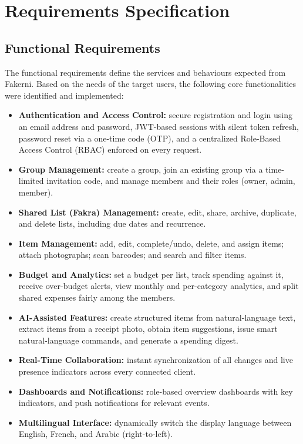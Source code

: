 \documentclass[12pt,a4paper,oneside]{report}
\begin{document}
\section{Requirements Specification}
\subsection{Functional Requirements}
The functional requirements define the services and behaviours expected from
Fakerni. Based on the needs of the target users, the following core
functionalities were identified and implemented:
\begin{itemize}[nosep]
  \item \textbf{Authentication and Access Control:} secure registration and login
        using an email address and password, JWT-based sessions with silent token
        refresh, password reset via a one-time code (OTP), and a centralized
        Role-Based Access Control (RBAC) enforced on every request.
  \item \textbf{Group Management:} create a group, join an existing group via a
        time-limited invitation code, and manage members and their roles (owner,
        admin, member).
  \item \textbf{Shared List (Fakra) Management:} create, edit, share, archive,
        duplicate, and delete lists, including due dates and recurrence.
  \item \textbf{Item Management:} add, edit, complete/undo, delete, and assign
        items; attach photographs; scan barcodes; and search and filter items.
  \item \textbf{Budget and Analytics:} set a budget per list, track spending
        against it, receive over-budget alerts, view monthly and per-category
        analytics, and split shared expenses fairly among the members.
  \item \textbf{AI-Assisted Features:} create structured items from
        natural-language text, extract items from a receipt photo, obtain item
        suggestions, issue smart natural-language commands, and generate a
        spending digest.
  \item \textbf{Real-Time Collaboration:} instant synchronization of all changes
        and live presence indicators across every connected client.
  \item \textbf{Dashboards and Notifications:} role-based overview dashboards with
        key indicators, and push notifications for relevant events.
  \item \textbf{Multilingual Interface:} dynamically switch the display language
        between English, French, and Arabic (right-to-left).
\end{itemize}
\end{document}
